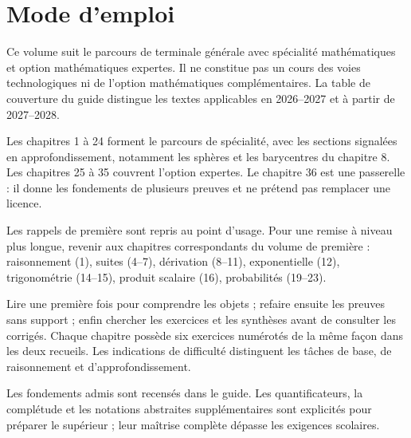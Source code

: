 \documentclass[11pt,a4paper,oneside]{book}
\begin{document}
\frontmatter
\chapter*{Mode d'emploi}
Ce volume suit le parcours de terminale générale avec spécialité mathématiques et option mathématiques expertes. Il ne constitue pas un cours des voies technologiques ni de l'option mathématiques complémentaires. La table de couverture du guide distingue les textes applicables en 2026--2027 et à partir de 2027--2028.

Les chapitres 1 à 24 forment le parcours de spécialité, avec les sections signalées en approfondissement, notamment les sphères et les barycentres du chapitre 8. Les chapitres 25 à 35 couvrent l'option expertes. Le chapitre 36 est une passerelle : il donne les fondements de plusieurs preuves et ne prétend pas remplacer une licence.

Les rappels de première sont repris au point d'usage. Pour une remise à niveau plus longue, revenir aux chapitres correspondants du volume de première : raisonnement (1), suites (4--7), dérivation (8--11), exponentielle (12), trigonométrie (14--15), produit scalaire (16), probabilités (19--23).

Lire une première fois pour comprendre les objets ; refaire ensuite les preuves sans support ; enfin chercher les exercices et les synthèses avant de consulter les corrigés. Chaque chapitre possède six exercices numérotés de la même façon dans les deux recueils. Les indications de difficulté distinguent les tâches de base, de raisonnement et d'approfondissement.

Les fondements admis sont recensés dans le guide. Les quantificateurs, la complétude et les notations abstraites supplémentaires sont explicités pour préparer le supérieur ; leur maîtrise complète dépasse les exigences scolaires.
\tableofcontents
\mainmatter

\end{document}
